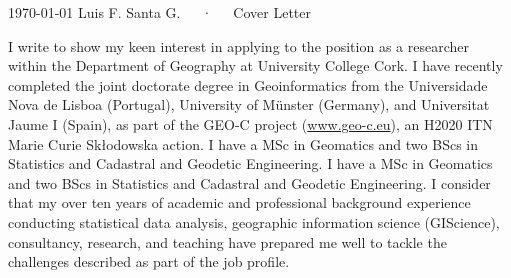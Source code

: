 \documentclass[11pt, a4paper]{awesome-cv}
\begin{document}
\makecvheader[R]

\makecvfooter
  {\today}
    {Luis F. Santa G.~~~·~~~Cover Letter}
  {}

\makelettertitle

\begin{cvletter}
I write to show my keen interest in applying to the position as a researcher within the Department of Geography at University College Cork. I have recently completed the joint doctorate degree in Geoinformatics from the Universidade Nova de Lisboa (Portugal), University of Münster (Germany), and Universitat Jaume I (Spain), as part of the GEO-C project (\url{www.geo-c.eu}), an H2020 ITN Marie Curie Skłodowska action. I have a MSc in Geomatics and two BScs in Statistics and Cadastral and Geodetic Engineering. I have a MSc in Geomatics and two BScs in Statistics and Cadastral and Geodetic Engineering. I consider that my over ten years of academic and professional background experience conducting statistical data analysis, geographic information science (GIScience), consultancy, research, and teaching have prepared me well to tackle the challenges described as part of the job profile.\par 

\end{cvletter}
\end{document}
